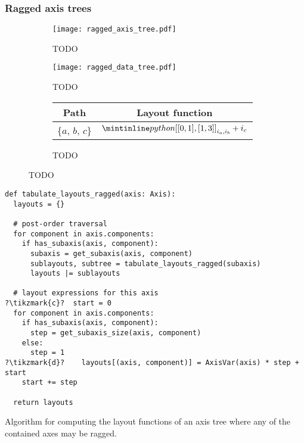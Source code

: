 \documentclass[thesis]{subfiles}
\begin{document}
\subsubsection{Ragged axis trees}
\label{sec:layout_alg_ragged}

\begin{figure}
  \centering
  \begin{subfigure}{.3\textwidth}
    \centering
    \texttt{[image: ragged\_axis\_tree.pdf]}
    \caption{TODO}
    \label{fig:ragged_axis_tree}
  \end{subfigure}
  \begin{subfigure}{.58\textwidth}
    \centering
    \texttt{[image: ragged\_data\_tree.pdf]}
    \caption{TODO}
    \label{fig:ragged_data_tree}
  \end{subfigure}

  \vspace{1em}

  \begin{subfigure}{\textwidth}
    \centering
    \begin{tabular}{|c|c|}
      \hline
      \textbf{Path} & \textbf{Layout function} \\
      \hline
      \{$a$, $b$, $c$\} & $\pycode{[[0, 1], [1, 3]]}_{i_a,i_b} + i_c$ \\
      \hline
    \end{tabular}
    \caption{TODO}
    \label{fig:ragged_layouts}
  \end{subfigure}
  \caption{TODO}
  \label{fig:ragged_axis_tree_all}
\end{figure}

\begin{algorithm}
  \begin{verbatim}
def tabulate_layouts_ragged(axis: Axis):
  layouts = {}

  # post-order traversal
  for component in axis.components:
    if has_subaxis(axis, component): 
      subaxis = get_subaxis(axis, component)
      sublayouts, subtree = tabulate_layouts_ragged(subaxis)
      layouts |= sublayouts

  # layout expressions for this axis
?\tikzmark{c}?  start = 0
  for component in axis.components:
    if has_subaxis(axis, component):
      step = get_subaxis_size(axis, component)
    else:
      step = 1
?\tikzmark{d}?    layouts[(axis, component)] = AxisVar(axis) * step + start
    start += step

  return layouts
  \end{verbatim}

  \caption{
    Algorithm for computing the layout functions of an axis tree where any of the contained axes may be ragged.
  }
  \label{alg:tabulate_layouts_ragged}
\end{algorithm}
\end{document}
